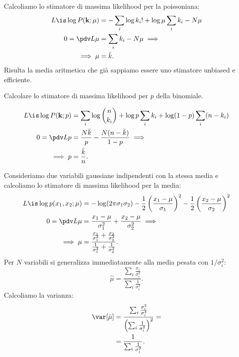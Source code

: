 
\begin{example}
	Calcoliamo lo stimatore di massima likelihood per la poissoniana:
	\begin{align*}
		L \is \log P(\mathbf k;\mu)
		&= -\sum_i \log k_i! + \log\mu \sum_i k_i - N\mu \\
		0 = \pdv L\mu
		&= \sum_i k_i - N\mu \implies \\
		\implies \mu
		&= \bar k.
	\end{align*}
	Risulta la media aritmetica che già sappiamo essere uno stimatore unbiased e efficiente.
\end{example}

\begin{exercise}
	Calcolare lo stimatore di massima likelihood per $p$ della binomiale.
\end{exercise}

\begin{solution}
	\begin{align*}
		L \is \log P(\mathbf k;p)
		&= \sum_i\log\binom n{k_i} + \log p\sum_i k_i + \log(1-p) \sum_i(n-k_i) \\
		0 = \pdv Lp
		&= \frac{N\bar k}{p} - \frac{N(n-\bar k)}{1-p} \implies \\
		\implies p
		&= \frac{\bar k}n.
	\end{align*}
\end{solution}

\begin{example}
	\label{th:wavg}
	Consideriamo due variabili gaussiane indipendenti con la stessa media e calcoliamo lo stimatore di massima likelihood per la media:
	\begin{align*}
		L \is \log p(x_1,x_2;\mu)
		&= -\log(2\pi\sigma_1\sigma_2)
		-\frac12 \left(\frac{x_1-\mu}{\sigma_1}\right)^2
		- \frac12 \left(\frac{x_2-\mu}{\sigma_2}\right)^2 \\
		0 = \pdv L\mu
		&= \frac{x_1-\mu}{\sigma_1^2} + \frac{x_2-\mu}{\sigma_2^2} \implies \\
		\implies \mu
		&= \frac {\frac{x_1}{\sigma_1^2} + \frac{x_2}{\sigma_2^2}} {\frac1{\sigma_1^2} + \frac1{\sigma_2^2}}.
	\end{align*}
	Per $N$ variabili si generalizza immediatamente alla media pesata con $1/\sigma_i^2$:
	\begin{equation*}
		\hat\mu
		= \frac {\sum_i \frac{x_i}{\sigma_i^2}} {\sum_i \frac1{\sigma_i^2}}.
	\end{equation*}
	Calcoliamo la varianza:
	\begin{align*}
		\var[\hat\mu]
		&= \frac {\sum_i \frac{\sigma_i^2}{\sigma_i^4}} {\left(\sum_i \frac1{\sigma_i^2}\right)^2} = \\
		&= \frac1{\sum_i \frac1{\sigma_i^2}}.
	\end{align*}
\end{example}

